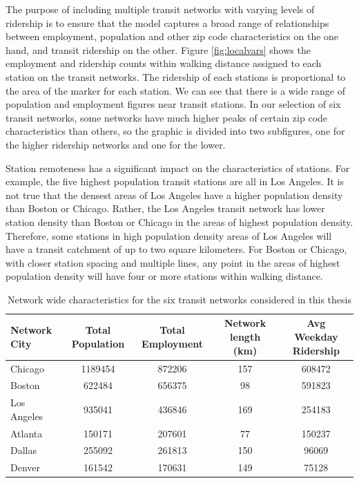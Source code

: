 \documentclass[11pt]{article}
\begin{document}
The purpose of including multiple transit networks with varying levels of ridership is to ensure that the model captures a broad range of relationships between employment, population and other zip code characteristics on the one hand, and transit ridership on the other. Figure \ref{fig:localvars} shows the employment and ridership counts within walking distance assigned to each station on the transit networks. The ridership of each stations is proportional to the area of the marker for each station. We can see that there is a wide range of population and employment figures near transit stations. In our selection of six transit networks, some networks have much higher peaks of certain zip code characteristics than others, so the graphic is divided into two subfigures, one for the higher ridership networks and one for the lower. 

Station remoteness has a significant impact on the characteristics of stations. For example, the five highest population transit stations are all in Los Angeles. It is not true that the densest areas of Los Angeles have a higher population density than Boston or Chicago. Rather, the Los Angeles transit network has lower station density than Boston or Chicago in the areas of highest population density. Therefore, some stations in high population density areas of Los Angeles will have a transit catchment of up to two square kilometers. For Boston or Chicago, with closer station spacing and multiple lines, any point in the areas of highest population density will have four or more stations within walking distance.  

\begin{table}
\centering\begingroup\fontsize{10}{10}\selectfont
\begin{tabular}{l|cccc}
\toprule Network City&Total Population&Total Employment&Network length (km)&Avg Weekday Ridership \\ 
\midrule Chicago&1189454&872206&157&608472\\
Boston&622484&656375&98&591823\\
Los Angeles&935041&436846&169&254183\\
Atlanta&150171&207601&77&150237\\
Dallas&255092&261813&150&96069\\
Denver&161542&170631&149&75128\\
\bottomrule
\end{tabular}\endgroup
\caption{Network wide characteristics for the six transit networks considered in this thesis}\label{tab:netsize}
\end{table}
\end{document}
